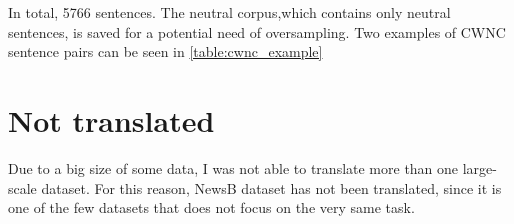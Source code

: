 


In total, 5766 sentences. The neutral corpus,which contains only neutral sentences, is saved for a potential need of oversampling. Two examples of CWNC sentence pairs can be seen in \ref{table:cwnc_example}





\section{Not translated}
Due to a big size of some data, I was not able to translate more than one large-scale dataset. For this reason, NewsB dataset has not been translated, since it is one of the few datasets that does not focus on the very same task.